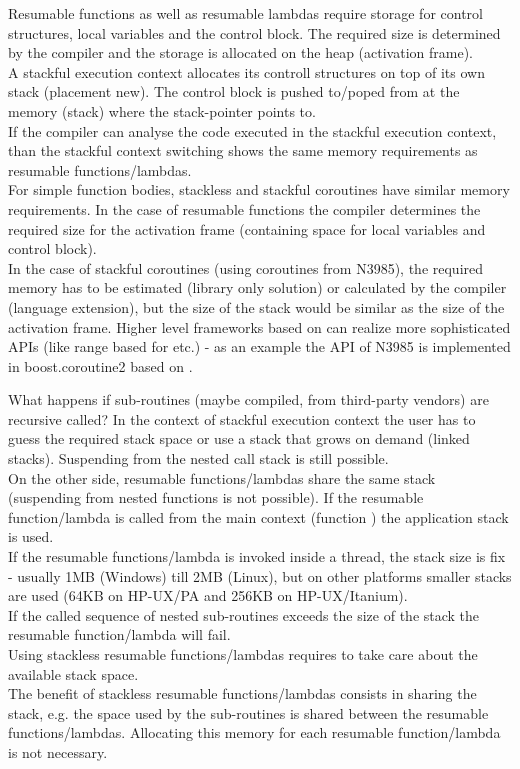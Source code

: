 Resumable functions as well as resumable lambdas require storage for control
structures, local variables and the control block. The required size is
determined by the compiler and the storage is allocated on the heap (activation
frame).\\
A stackful execution context allocates its controll structures on top of its own
stack (placement new). The control block is pushed to/poped from at the
memory (stack) where the stack-pointer points to.\\
If the compiler can analyse the code executed in the stackful execution context,
than the stackful context switching shows the same memory requirements as
resumable functions/lambdas.\\
\newline
For simple function bodies, stackless and stackful coroutines have similar
memory requirements.
In the case of resumable functions the compiler determines the required size for
the activation frame (containing space for local variables and control block).\\
In the case of stackful coroutines (using coroutines from N3985), the required
memory has to be estimated (library only solution) or calculated by the compiler
(language extension), but the size of the stack would be similar as the size
of the activation frame.
Higher level frameworks based on \ectx can realize more sophisticated APIs
(like range based for etc.) - as an example the API of N3985\cite{N3985} is
implemented in boost.coroutine2\cite{bcoroutine2} based on
.

What happens if sub-routines (maybe compiled, from third-party vendors) are
recursive called? In the context of stackful execution context
the user has to guess the required stack space or use a stack that grows on
demand (linked stacks). Suspending from the nested call stack is still
possible.\\
\newline
On the other side, resumable functions/lambdas share the same stack (suspending
from nested functions is not possible). If the resumable function/lambda is
called from the main context (function \main) the application stack is used.\\
If the resumable functions/lambda is invoked inside a thread, the stack size is
fix - usually 1MB (Windows) till 2MB (Linux), but on other platforms smaller
stacks are used (64KB on HP-UX/PA and 256KB on HP-UX/Itanium).\\
If the called sequence of nested sub-routines exceeds the size of the stack the
resumable function/lambda will fail.\\
\newline
Using stackless resumable functions/lambdas requires to take care about the
available stack space.\\
\newline
The benefit of stackless resumable functions/lambdas consists in sharing the
stack, e.g. the space used by the sub-routines is shared between the resumable
functions/lambdas. Allocating this memory for each resumable function/lambda is
not necessary.

